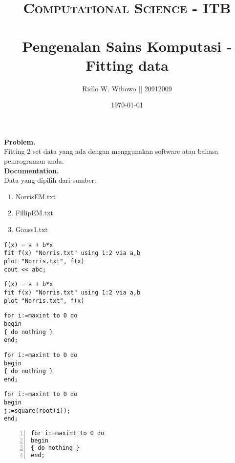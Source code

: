 \documentclass[paper=a4, fontsize=11pt]{scrartcl}
\title{	
\normalfont \normalsize 
\textsc{Computational Science - ITB} \\ [25pt] %
\horrule{0.5pt} \\[0.4cm] %
\small  Pengenalan Sains Komputasi - Fitting data\\ %
}
\author{\small{Ridlo W. Wibowo || 20912009}} %
\date{\normalsize\today} %
\numberwithin{equation}{section} %
\numberwithin{figure}{section} %
\numberwithin{table}{section} %
\begin{document}
\maketitle %

\large \textbf{Problem.}\\
Fitting 2 set data yang ada dengan menggunakan software atau bahasa pemrograman anda.\\

\large \textbf{Documentation.}\\
Data yang dipilih dari sumber:
\begin{enumerate}
\item NorrisEM.txt
\item FillipEM.txt
\item Gauss1.txt
\end{enumerate}

\lstset{language=bash}
\begin{lstlisting}
f(x) = a + b*x
fit f(x) "Norris.txt" using 1:2 via a,b
plot "Norris.txt", f(x)
cout << abc;
\end{lstlisting}

\begin{lstlisting}
f(x) = a + b*x
fit f(x) "Norris.txt" using 1:2 via a,b
plot "Norris.txt", f(x)
\end{lstlisting}

\lstset{frameround=fttt}
\begin{lstlisting}[frame=trBL]
for i:=maxint to 0 do
begin
{ do nothing }
end;
\end{lstlisting}

\begin{lstlisting}[frame=trBL]
for i:=maxint to 0 do
begin
{ do nothing }
end;
\end{lstlisting}



\begin{lstlisting}[frame=single,
framerule=0pt]
for i:=maxint to 0 do
begin
j:=square(root(i));
end;
\end{lstlisting}



\begin{lstlisting}[numbers=left]
for i:=maxint to 0 do
begin
{ do nothing }
end;
\end{lstlisting}
\end{document}

